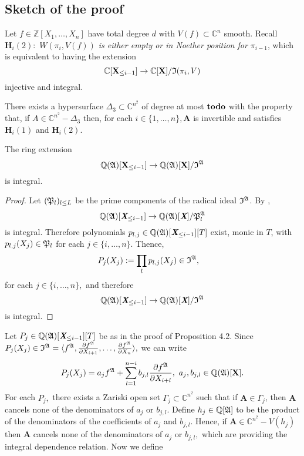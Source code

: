 \documentclass[sigconf]{acmart}
\def\td{{\bf todo}}
\def\Xb{\textit{\textbf{X}}}
\def\mA{{\bm A}}
\def\C{\mathbb{C}}
\def\Q{\mathbb{Q}}
\newcommand{\ZZ}{{\mathbb{Z}}}
\def\I{\frak{I}}
\def\A{\frak{A}}
\def\fp{\frak{P}}
\begin{document}
\subsection{Sketch of the proof}
%
Let $f \in \ZZ[X_1,\hdots,X_n]$ have total degree $d$ with $V(f) \subset \C^n$ smooth. Recall $\textbf{H}_i(2):$ \textit{$W(\pi_i,V(f))$ is either empty or in Noether position for
  $\pi_{i-1}$}, which is equivalent to having the extension  
\[
\C[\textbf{X}_{\leq i-1}]\rightarrow\C[\textbf{X}]/\frak{I}(\pi_i,V)
\]
injective and  integral.
%
\begin{theorem}
There exists a hypersurface $\Delta_3 \subset \C^{n^2}$ of degree at most $\td$ with the property that, if $A \in \C^{n^2} - \Delta_3$ then, for each $i \in\{1,\hdots,n\}, \mA$ is
invertible and satisfies $\textbf{H}_i(1)$ and $\textbf{H}_i(2)$.
\end{theorem}
%
\begin{proposition} 
The ring extension \[\mathbb{Q}(\frak{A})[\textbf{X}_{\leq i-1}]\rightarrow\mathbb{Q}(\frak{A})[\textbf{X}]/\I^{\A}\] is integral.
\end{proposition}
%
\begin{proof}
Let $(\frak{P}_l)_{l \leq L}$ be the prime components of the radical ideal $\I^\A$. By \cite[Proposition 1]{EMP}, 
\[
\mathbb{Q}(\frak{A})[\Xb_{\leq i-1}]\rightarrow\mathbb{Q}(\frak{A})[\Xb]/\fp_l^{\A}
\] 
is integral. Therefore polynomials $p_{l,j}\in\mathbb{Q}(\frak{A})[\Xb_{\leq i-1}][T]$ exist, monic in $T$, with $p_{l,j}(X_j)\in \frak{P}_l$ for each $j\in \{i,\hdots,n\}.$ Thence, 
%
\begin{align*}
&P_{j}(X_j) := \prod_l p_{l,j}(X_j)\in\I^\A, 
\end{align*}
%
for each $j \in \{i,\hdots,n\},$ and therefore 
\[
\mathbb{Q}(\frak{A})[\Xb_{\leq i-1}]\rightarrow\mathbb{Q}(\frak{A})[\Xb]/\I^{\A}
\] 
is integral.
\end{proof}
%
Let $P_{j} \in \mathbb{Q}(\frak{A})[\Xb_{\leq i-1}][T]$ be as in the proof of Proposition 4.2. Since $P_{j}(X_j) \in\I^{\A}= \langle f^\A,\frac{\partial f^\A}{\partial X_{i+1}},\hdots,\frac{\partial f^\A}{\partial X_n} \rangle,$
 we can write
\[
P_{j}(X_j) = a_j f^{\A} + \sum_{l=1}^{n-i}b_{j,l} \frac{\partial f^\A}{\partial X_{i+l}}, ~a_j,b_{j,l} \in \mathbb{Q}(\A)[\textbf{X}].
\]
For each $P_j,$ there exists a Zariski open set $\Gamma_j \subset \C^{n^2}$ such that if $\mA \in \Gamma_j$,
then $\mA$ cancels none of the denominators of $a_{j}$ or $b_{j,l}$. Define $h_j \in \Q[\A]$ to be the product of the denominators of the coefficients of $a_j$ and $b_{j,l}$. Hence, if $\mA \in \C^{n^2}-V(h_j)$ then $\mA$ cancels none of the denominators of $a_{j}$ or $b_{j,l},$ which are providing the integral dependence relation. Now we define 
\end{document}
